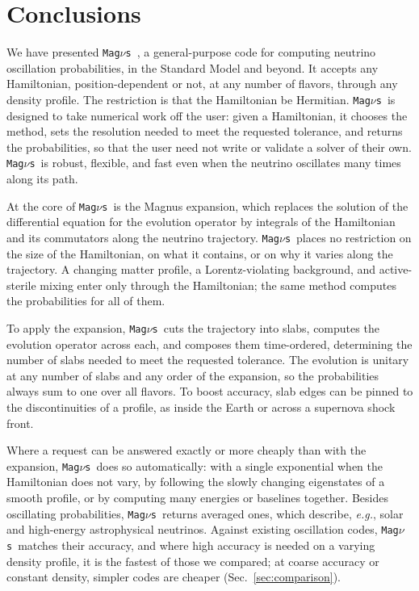 \documentclass[final,5p,times,twocolumn,sort,compress]{elsarticle}
\makeatletter
\newcommand{\eg}{{\it e.g.}}
\DeclareRobustCommand{\_}{%
  \ifmmode\nfss@text{\textunderscore}\else\textunderscore\allowbreak\fi}
\newcommand{\magnus}{{\tt Mag}\ensuremath{\nu}{\tt s}}
\makeatother
\begin{document}

\section{Conclusions}
\label{sec:conclusions}

We have presented \magnus\ \cite{Magnus}, a general-purpose code for computing neutrino oscillation probabilities, in the Standard Model and beyond. It accepts any Hamiltonian, position-dependent or not, at any number of flavors, through any density profile. The restriction is that the Hamiltonian be Hermitian. \magnus\ is designed to take numerical work off the user: given a Hamiltonian, it chooses the method, sets the resolution needed to meet the requested tolerance, and returns the probabilities, so that the user need not write or validate a solver of their own. \magnus\ is robust, flexible, and fast even when the neutrino oscillates many times along its path.

At the core of \magnus\ is the Magnus expansion, which replaces the solution of the differential equation for the evolution operator by integrals of the Hamiltonian and its commutators along the neutrino trajectory. \magnus\ places no restriction on the size of the Hamiltonian, on what it contains, or on why it varies along the trajectory. A changing matter profile, a Lorentz-violating background, and active-sterile mixing enter only through the Hamiltonian; the same method computes the probabilities for all of them.

To apply the expansion, \magnus\ cuts the trajectory into slabs, computes the evolution operator across each, and composes them time-ordered, determining the number of slabs needed to meet the requested tolerance. The evolution is unitary at any number of slabs and any order of the expansion, so the probabilities always sum to one over all flavors. To boost accuracy, slab edges can be pinned to the discontinuities of a profile, as inside the Earth or across a supernova shock front.

Where a request can be answered exactly or more cheaply than with the expansion, \magnus\ does so automatically: with a single exponential when the Hamiltonian does not vary, by following the slowly changing eigenstates of a smooth profile, or by computing many energies or baselines together. Besides oscillating probabilities, \magnus\ returns averaged ones, which describe, \eg, solar and high-energy astrophysical neutrinos. Against existing oscillation codes, \magnus\ matches their accuracy, and where high accuracy is needed on a varying density profile, it is the fastest of those we compared; at coarse accuracy or constant density, simpler codes are cheaper (Sec.~\ref{sec:comparison}).
\end{document}

